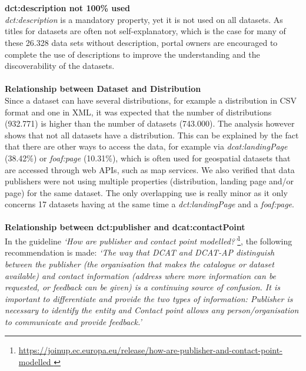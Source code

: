 \documentclass[<options>]{elsarticle}
\begin{document}
\\
\\
\textbf{dct:description not 100\% used}\\
\textit{dct:description} is a mandatory property, yet it is not used on all datasets. As titles for datasets are often not self-explanatory, which is the case for many of these  26.328 data sets without description, portal owners are encouraged to complete the use of descriptions to improve the understanding and the discoverability of the datasets.
\\
\\
\textbf{Relationship between Dataset and Distribution}\\
Since a dataset can have several distributions, for example a distribution in CSV format and one in XML, it was expected that the number of distributions (932.771) is higher than the number of datasets (743.000). The analysis however shows that not all datasets have a distribution. This can be explained by the fact that there are other ways to access the data, for example via \textit{dcat:landingPage} (38.42\%) or \textit{foaf:page} (10.31\%), which is often used for geospatial datasets that are accessed through web APIs, such as map services.  We also verified that data publishers were not using multiple properties (distribution, landing page and/or page) for the same dataset. The only overlapping use is really minor as it only concerns 17 datasets having at the same time a \textit{dct:landingPage} and a \textit{foaf:page}.
\\
\\
\textbf{Relationship between dct:publisher and dcat:contactPoint}\\
In the guideline \textit{‘How are publisher and contact point modelled?’}\footnote{\href{ https://joinup.ec.europa.eu/release/how-are-publisher-and-contact-point-modelled }{ https://joinup.ec.europa.eu/release/how-are-publisher-and-contact-point-modelled }}, the following recommendation is made:
\textit{‘The way that DCAT and DCAT-AP distinguish between the publisher (the organisation that makes the catalogue or dataset available) and contact information (address where more information can be requested, or feedback can be given) is a continuing source of confusion. It is important to differentiate and provide the two types of information: Publisher is necessary to identify the entity and Contact point allows any person/organisation to communicate and provide feedback.’}
\end{document}
